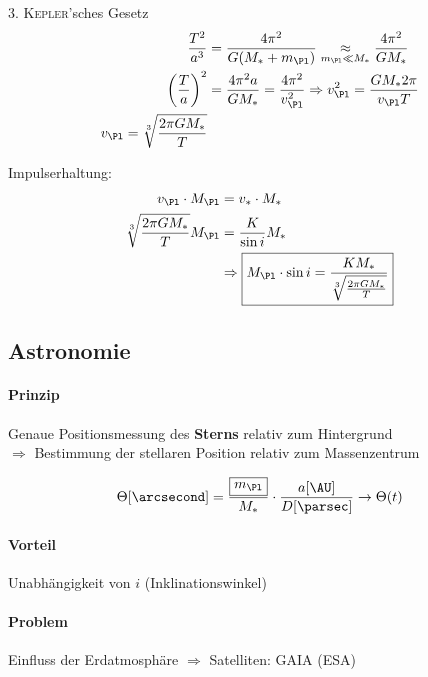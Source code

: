 3. \textsc{Kepler}'sches Gesetz
\begin{align*}
    \frac{T^2}{a^3} &= \frac{4 \pi^2}{G (M_* + m_{\Pl})} \mathrel{\underset{{m_\Pl \ll M_*}}\approx} \frac{4 \pi^2}{G M_*} \\
    \left(\frac{T}{a}\right)^2 &= \frac{4 \pi^2 a}{GM_*} = \frac{4\pi^2}{v_\Pl^2} \Rightarrow v_\Pl^2 = \frac{GM_*2\pi}{v_\Pl T} \\
    v_\Pl = \sqrt[3]{\frac{2 \pi G M_*}{T}}
\end{align*}

Impulserhaltung:
\begin{align*}
    v_\Pl \cdot M_\Pl &= v_* \cdot M_* \\
    \sqrt[3]{\frac{2\pi GM_*}{T}} M_\Pl &= \frac{K}{\sin i} M_* \\
                                        &\Rightarrow \boxed{M_\Pl \cdot \sin i = \frac{K M_*}{\sqrt[3]{\frac{2\pi GM_*}{T}}}}
\end{align*}

\subsection{Astronomie}
\paragraph{Prinzip} Genaue Positionsmessung des \textbf{Sterns} relativ zum
    Hintergrund \\
    $\Rightarrow$ Bestimmung der stellaren Position relativ zum Massenzentrum

\[ \Theta [\arcsecond] = \frac{\boxed{m_\Pl}}{M_*} \cdot \frac{a[\AU]}{D[\parsec]} \rightarrow \Theta(t) \]

\paragraph{Vorteil} Unabhängigkeit von $i$ (Inklinationswinkel)

\paragraph{Problem} Einfluss der Erdatmosphäre
$\Rightarrow$ Satelliten: GAIA (ESA)
